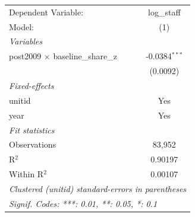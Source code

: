 
\begingroup
\centering
\begin{tabular}{lc}
   \tabularnewline \midrule \midrule
   Dependent Variable:                     & log\_staff\\   
   Model:                                  & (1)\\  
   \midrule
   \emph{Variables}\\
   post2009 $\times$ baseline\_share\_z    & -0.0384$^{***}$\\   
                                           & (0.0092)\\   
   \midrule
   \emph{Fixed-effects}\\
   unitid                                  & Yes\\  
   year                                    & Yes\\  
   \midrule
   \emph{Fit statistics}\\
   Observations                            & 83,952\\  
   R$^2$                                   & 0.90197\\  
   Within R$^2$                            & 0.00107\\  
   \midrule \midrule
   \multicolumn{2}{l}{\emph{Clustered (unitid) standard-errors in parentheses}}\\
   \multicolumn{2}{l}{\emph{Signif. Codes: ***: 0.01, **: 0.05, *: 0.1}}\\
\end{tabular}
\par\endgroup


